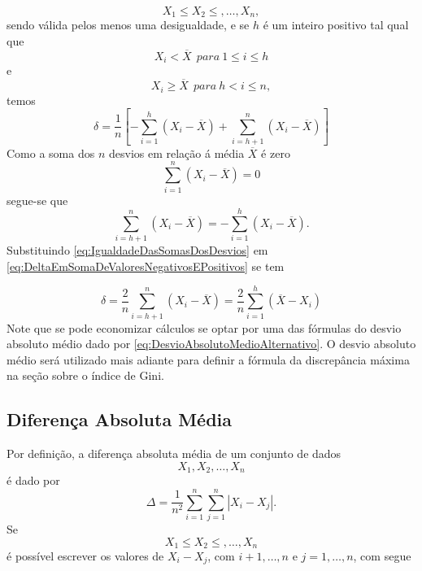 \documentclass[
]{book}
\begin{document}
\[
  X_1\leq X_2 \leq , \ldots, X_n,  
\]
sendo válida pelos menos uma desigualdade, e se \(h\) é um inteiro positivo tal qual que
\[
  X_i < \overline{X}~~para~1 \leq i \leq h
\]
e
\[
  X_i \geq \overline{X}~~para~h < i \leq n, 
\]
temos
\[
  \delta = \dfrac{1}{n}\left[ - \sum_{i=1}^{h}\left( X_i - \overline{X} \right) + \sum_{i=h+1}^{n} \left( X_i - \overline{X} \right) \right] 
\label{eq:DeltaEmSomaDeValoresNegativosEPositivos}
\]
Como a soma dos \(n\) desvios em relação á média \(\overline{X}\) é zero
\[
  \sum_{i=1}^{n} \left(X_i - \overline{X} \right) = 0
\]
segue-se que
\[
  \sum_{i=h+1}^{n} \left( X_i - \overline{X} \right) = - \sum_{i=1}^{h}\left( X_i - \overline{X} \right).
  \label{eq:IgualdadeDasSomasDosDesvios}
\]
Substituindo \eqref{eq:IgualdadeDasSomasDosDesvios} em \eqref{eq:DeltaEmSomaDeValoresNegativosEPositivos} se tem

\[
  \delta = \dfrac{2}{n} \sum_ {i=h+1}^{n}\left( X_i - \overline{X} \right) = \dfrac{2}{n} \sum_ {i=1}^{h} \left( \overline{X} - X_i  \right)
\label{eq:DesvioAbsolutoMedioAlternativo}
\]
Note que se pode economizar cálculos se optar por uma das fórmulas do desvio absoluto médio dado por \eqref{eq:DesvioAbsolutoMedioAlternativo}. O desvio absoluto médio será utilizado mais adiante para definir a fórmula da discrepância máxima na seção sobre o índice de Gini.

\hypertarget{diferenuxe7a-absoluta-muxe9dia}{%
\subsection{Diferença Absoluta Média}\label{diferenuxe7a-absoluta-muxe9dia}}

Por definição, a diferença absoluta média de um conjunto de dados
\[
X_1, X_2, \ldots, X_n
\]
é dado por
\[
\Delta = \dfrac{1}{n^2} \sum_{i=1}^{n} \sum_{j=1}^{n} \left| X_i - X_j \right|.
\]
Se
\[
X_1 \leq X_2 \leq , \ldots, X_n
\]
é possível escrever os valores de \(X_i -X_j\), com \(i+1,\ldots, n\) e \(j=1,\ldots,n\), com segue
\end{document}
